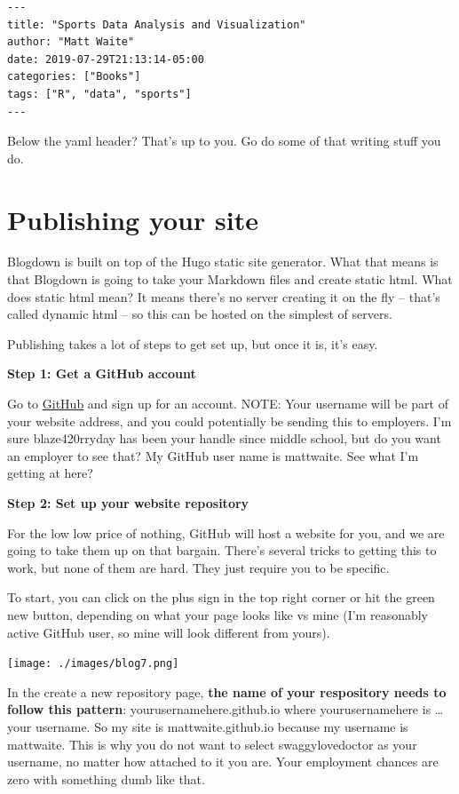 \documentclass[
  letterpaper,
  DIV=11,
  numbers=noendperiod]{scrreprt}
\begin{document}
\begin{verbatim}
---
title: "Sports Data Analysis and Visualization"
author: "Matt Waite"
date: 2019-07-29T21:13:14-05:00
categories: ["Books"]
tags: ["R", "data", "sports"]
---
\end{verbatim}

Below the yaml header? That's up to you. Go do some of that writing
stuff you do.

\hypertarget{publishing-your-site}{%
\section{Publishing your site}\label{publishing-your-site}}

Blogdown is built on top of the Hugo static site generator. What that
means is that Blogdown is going to take your Markdown files and create
static html. What does static html mean? It means there's no server
creating it on the fly -- that's called dynamic html -- so this can be
hosted on the simplest of servers.

Publishing takes a lot of steps to get set up, but once it is, it's
easy.

\textbf{Step 1: Get a GitHub account}

Go to \href{https://GitHub.com/}{GitHub} and sign up for an account.
NOTE: Your username will be part of your website address, and you could
potentially be sending this to employers. I'm sure blaze420rryday has
been your handle since middle school, but do you want an employer to see
that? My GitHub user name is mattwaite. See what I'm getting at here?

\textbf{Step 2: Set up your website repository}

For the low low price of nothing, GitHub will host a website for you,
and we are going to take them up on that bargain. There's several tricks
to getting this to work, but none of them are hard. They just require
you to be specific.

To start, you can click on the plus sign in the top right corner or hit
the green new button, depending on what your page looks like vs mine
(I'm reasonably active GitHub user, so mine will look different from
yours).

\texttt{[image: ./images/blog7.png]}

In the create a new repository page, \textbf{the name of your
respository needs to follow this pattern}: yourusernamehere.github.io
where yourusernamehere is \ldots{} your username. So my site is
mattwaite.github.io because my username is mattwaite. This is why you do
not want to select swaggylovedoctor as your username, no matter how
attached to it you are. Your employment chances are zero with something
dumb like that.
\end{document}
